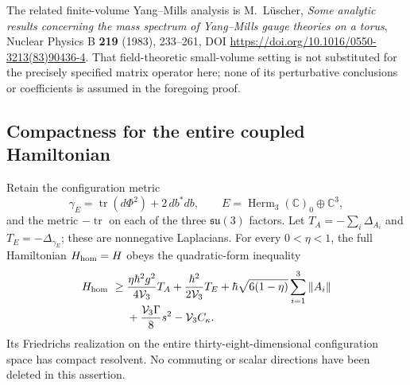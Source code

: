The related finite-volume Yang--Mills analysis is M.~L\"uscher,
\emph{Some analytic results concerning the mass spectrum of Yang--Mills
gauge theories on a torus}, Nuclear Physics B \textbf{219} (1983),
233--261, DOI \url{https://doi.org/10.1016/0550-3213(83)90436-4}.
That field-theoretic small-volume setting is not substituted for the
precisely specified matrix operator here; none of its perturbative
conclusions or coefficients is assumed in the foregoing proof.


\subsection{Compactness for the entire coupled Hamiltonian}
\label{qh:combined-section}

\begin{theorem}
\label{qh:full-compact}
Retain the configuration metric
\[
 \gamma_E=\operatorname{tr}(d\Phi^2)+2\,db^*db,
 \qquad E=\operatorname{Herm}_3(\mathbb C)_0\oplus\mathbb C^3,
\]
and the metric $-\operatorname{tr}$ on each of the three
$\mathfrak{su}(3)$ factors. Let $T_A=-\sum_i\Delta_{A_i}$ and
$T_E=-\Delta_{\gamma_E}$; these are nonnegative Laplacians.
For every $0<\eta<1$, the full Hamiltonian $H_{\rm hom}=H$ obeys
the quadratic-form inequality
\begin{align}
 H_{\rm hom}\ \geq\;&
 \frac{\eta\hbar^2g^2}{4\mathcal V_3}T_A
 +\frac{\hbar^2}{2\mathcal V_3}T_E
 +\hbar\sqrt{6(1-\eta)}\sum_{i=1}^3\|A_i\|
 \notag\\*[-1mm]
 &+\frac{\mathcal V_3\Gamma}{8}s^2
 -\mathcal V_3 C_\kappa.
 \label{qh:full-form-bound}
\end{align}
Its Friedrichs realization on the entire thirty-eight-dimensional
configuration space has compact resolvent. No commuting or scalar
directions have been deleted in this assertion.
\end{theorem}
